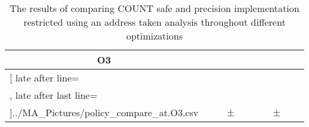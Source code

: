 \begin{table}[!htbp]
{\begin{tabular}{l|c|rcl|c|rcl|c}
\multicolumn{1}{c}{\bfseries O3}
	\\\midrule
	\csvreader[ late after line=\\, late after last line=\\\bottomrule]{../MA_Pictures/policy_compare_at.O3.csv}{
}
	{\csvcolii  &  \csvcoliii & \csvcoliv & $\pm$ & \csvcolv & \csvcolvi & \csvcolvii & $\pm$ & \csvcolviii& \csvcolix}%

    	\end{tabular}
}
		\caption {The results of comparing COUNT safe and precision implementation restricted using an address taken analysis throughout different optimizations}
		\label{tbl:policycompat}
\end{table}

